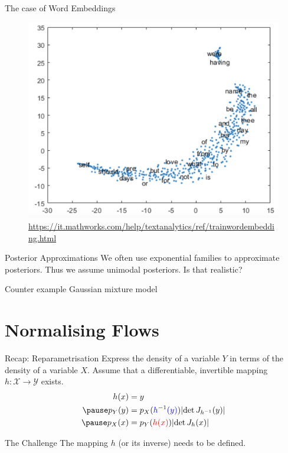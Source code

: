 \begin{frame}{The case of Word Embeddings}
\pause
\begin{figure}
\includegraphics[scale=.2]{wordcloud.png}
\caption{\url{https://it.mathworks.com/help/textanalytics/ref/trainwordembedding.html}}
\end{figure}
\end{frame}

\begin{frame}{Posterior Approximations}
We often use exponential families to approximate posteriors. Thus we assume unimodal posteriors. Is that realistic?
\pause
\begin{block}{Counter example}
Gaussian mixture model
\end{block}
\end{frame}

\section{Normalising Flows}

\begin{frame}
\tableofcontents[current]
\end{frame}

\begin{frame}{Recap: Reparametrisation}
Express the density of a variable $ Y $ in terms of the density of a variable $ X $. Assume that a differentiable, invertible mapping
$ h: \mathcal{X} \rightarrow \mathcal{Y} $ exists.
\begin{equation*}
\begin{aligned}
h(x) &= y \\ \pause
p_{Y}(y) &= p_{X}(\textcolor{blue}{h^{-1}(y)})\djac{h^{-1}}{y}  \\ \pause
p_{X}(x) &= p_{Y}(\textcolor{red}{h(x)})\djac{h}{x}
\end{aligned}
\end{equation*}
\pause
\begin{block}{The Challenge}
The mapping $ h $ (or its inverse) needs to be defined.
\end{block}
\end{frame}

